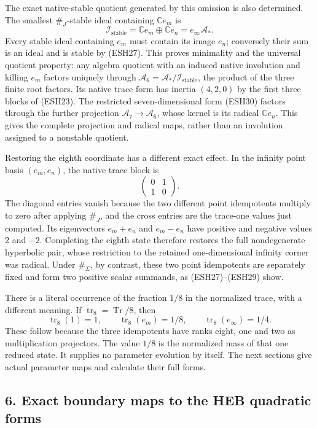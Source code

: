 \documentclass[
  10pt,
  a4paper,
]{article}
\begin{document}
The exact native-stable quotient generated by this omission is also
determined. The smallest \(\#_J\)-stable ideal containing
\(\mathbb Ce_m\) is \[
\mathcal I_{\mathrm{stable}}=\mathbb Ce_m\oplus\mathbb Ce_n
=e_\infty\mathcal A_*.
\tag{ESH30a}
\] Every stable ideal containing \(e_m\) must contain its image \(e_n\);
conversely their sum is an ideal and is stable by (ESH27). This proves
minimality and the universal quotient property: any algebra quotient
with an induced native involution and killing \(e_m\) factors uniquely
through \(\mathcal A_6=\mathcal A_*/\mathcal I_{\mathrm{stable}}\), the
product of the three finite root factors. Its native trace form has
inertia \((4,2,0)\) by the first three blocks of (ESH23). The restricted
seven-dimensional form (ESH30) factors through the further projection
\(\mathcal A_7\to\mathcal A_6\), whose kernel is its radical
\(\mathbb Ce_n\). This gives the complete projection and radical maps,
rather than an involution assigned to a nonstable quotient.

Restoring the eighth coordinate has a different exact effect. In the
infinity point basis \((e_m,e_n)\), the native trace block is \[
\begin{pmatrix}0&1\\1&0\end{pmatrix}.
\tag{ESH30b}
\] The diagonal entries vanish because the two different point
idempotents multiply to zero after applying \(\#_J\), and the cross
entries are the trace-one values just computed. Its eigenvectors
\(e_m+e_n\) and \(e_m-e_n\) have positive and negative values 2 and
\(-2\). Completing the eighth state therefore restores the full
nondegenerate hyperbolic pair, whose restriction to the retained
one-dimensional infinity corner was radical. Under \(\#_\Sigma\), by
contrast, these two point idempotents are separately fixed and form two
positive scalar summands, as (ESH27)--(ESH29) show.

There is a literal occurrence of the fraction \(1/8\) in the normalized
trace, with a different meaning. If
\(\operatorname{tr}_8=\operatorname{Tr}/8\), then \[
\operatorname{tr}_8(1)=1,\qquad
\operatorname{tr}_8(e_m)=1/8,\qquad
\operatorname{tr}_8(e_\infty)=1/4.
\tag{ESH31}
\] These follow because the three idempotents have ranks eight, one and
two as multiplication projectors. The value \(1/8\) is the normalized
mass of that one reduced state. It supplies no parameter evolution by
itself. The next sections give actual parameter maps and calculate their
full forms.

\subsection{6. Exact boundary maps to the HEB quadratic
forms}\label{exact-boundary-maps-to-the-heb-quadratic-forms}
\end{document}
